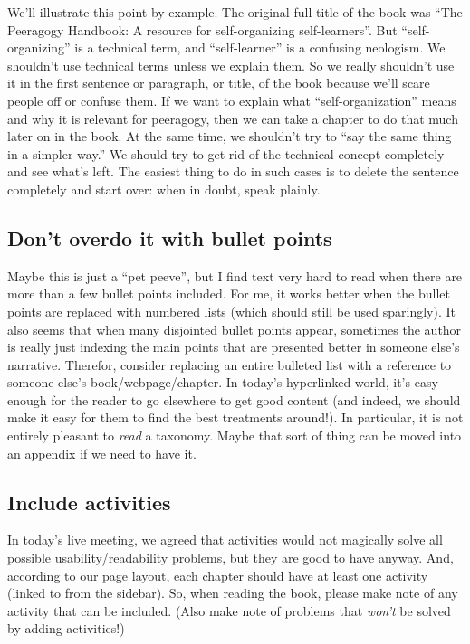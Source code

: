 We'll illustrate this point by example. The original full title of the
book was ``The Peeragogy Handbook: A resource for self-organizing
self-learners''. But ``self-organizing''
is a technical term, and ``self-learner'' is a confusing neologism. We
shouldn't use technical terms unless we explain them. So we really
shouldn't use it in the first sentence or paragraph, or title, of the
book because we'll scare people off or confuse them. If we want to
explain what ``self-organization'' means and why it is relevant for
peeragogy, then we can take a chapter to do that much later on in the
book. At the same time, we shouldn't try to ``say the same thing in a
simpler way.'' We should try to get rid of the technical concept
completely and see what's left. The easiest thing to do in such cases is
to delete the sentence completely and start over: when in doubt, speak
plainly.

\subsection{Don't overdo it with bullet points}

Maybe this is just a ``pet peeve'', but I find text very hard to read
when there are more than a few bullet points included. For me, it works
better when the bullet points are replaced with numbered lists (which
should still be used sparingly). It also seems that when many disjointed
bullet points appear, sometimes the author is really just indexing the
main points that are presented better in someone else's narrative.
Therefor, consider replacing an entire bulleted list with a reference to
someone else's book/webpage/chapter. In today's hyperlinked world, it's
easy enough for the reader to go elsewhere to get good content (and
indeed, we should make it easy for them to find the best treatments
around!). In particular, it is not entirely pleasant to \emph{read} a
taxonomy. Maybe that sort of thing can be moved into an appendix if we
need to have it.

\subsection{Include activities}

In today's live meeting, we agreed that activities would not magically
solve all possible usability/readability problems, but they are good to
have anyway. And, according to our page layout, each chapter should have
at least one activity (linked to from the sidebar). So, when reading the
book, please make note of any activity that can be included. (Also make
note of problems that \emph{won't} be solved by adding activities!)

